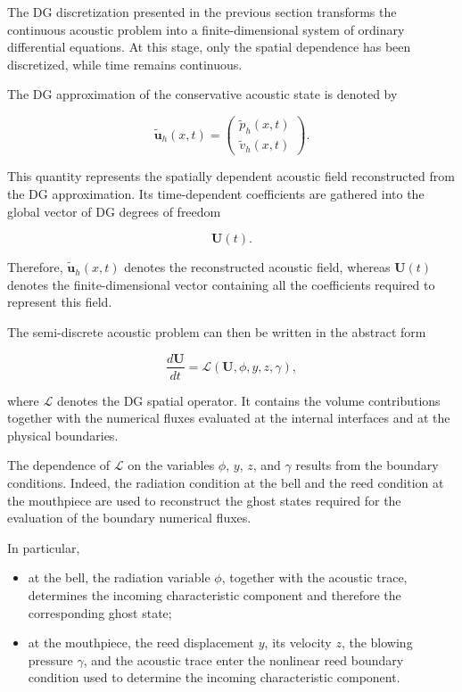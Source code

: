 \documentclass[11pt,a4paper]{report}
\theoremstyle{plain}
\theoremstyle{definition}
\begin{document}
The DG discretization presented in the previous section transforms the
continuous acoustic problem into a finite-dimensional system of ordinary
differential equations. At this stage, only the spatial dependence has been
discretized, while time remains continuous.

The DG approximation of the conservative acoustic state is denoted by

\begin{equation}
\tilde{\mathbf u}_h(x,t)
=
\begin{pmatrix}
\tilde p_h(x,t)\\
\tilde v_h(x,t)
\end{pmatrix}.
\end{equation}

This quantity represents the spatially dependent acoustic field reconstructed
from the DG approximation. Its time-dependent coefficients are gathered into
the global vector of DG degrees of freedom

\begin{equation}
\mathbf U(t).
\end{equation}

Therefore, \(\tilde{\mathbf u}_h(x,t)\) denotes the reconstructed acoustic
field, whereas \(\mathbf U(t)\) denotes the finite-dimensional vector
containing all the coefficients required to represent this field.

The semi-discrete acoustic problem can then be written in the abstract form

\begin{equation}
\boxed{
\frac{d\mathbf U}{dt}
=
\mathcal L
\left(
\mathbf U,\phi,y,z,\gamma
\right),
}
\label{eq:semi_discrete_system}
\end{equation}

where \(\mathcal L\) denotes the DG spatial operator. It contains the volume
contributions together with the numerical fluxes evaluated at the internal
interfaces and at the physical boundaries.

The dependence of \(\mathcal L\) on the variables
\(\phi\), \(y\), \(z\), and \(\gamma\) results from the boundary conditions.
Indeed, the radiation condition at the bell and the reed condition at the
mouthpiece are used to reconstruct the ghost states required for the
evaluation of the boundary numerical fluxes.

In particular,

\begin{itemize}
    \item at the bell, the radiation variable \(\phi\), together with the
    acoustic trace, determines the incoming characteristic component and
    therefore the corresponding ghost state;

    \item at the mouthpiece, the reed displacement \(y\), its velocity \(z\),
    the blowing pressure \(\gamma\), and the acoustic trace enter the nonlinear
    reed boundary condition used to determine the incoming characteristic
    component.
\end{itemize}
\end{document}
